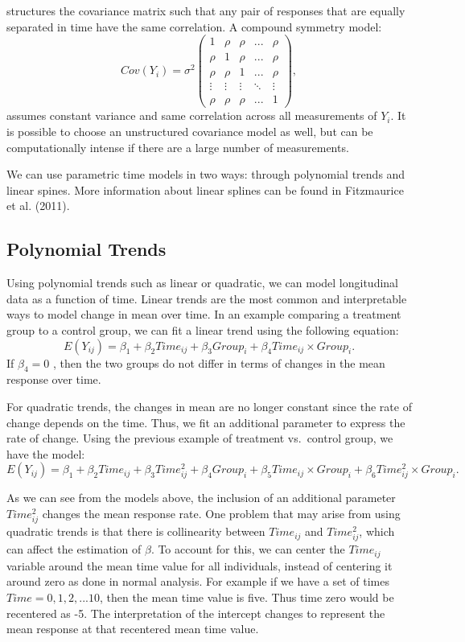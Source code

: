 \documentclass[12pt, twoside]{amherstthesis}
\begin{document}
structures the covariance matrix such that any pair of responses that are equally separated in time have the same correlation. A compound symmetry model: \[Cov (Y_i) = \sigma^2\begin{pmatrix} 1 & \rho & \rho & ... & \rho \\ \rho & 1 & \rho & ... & \rho \\ \rho & \rho & 1 & ...& \rho \\ \vdots & \vdots & \vdots & \ddots& \vdots \\ \rho & \rho & \rho & ... & 1   \end{pmatrix}, \] assumes constant variance and same correlation across all measurements of \(Y_i.\) It is possible to choose an unstructured covariance model as well, but can be computationally intense if there are a large number of measurements.

We can use parametric time models in two ways: through polynomial trends and linear spines. More information about linear splines can be found in Fitzmaurice et al. (2011).

\hypertarget{polynomial-trends}{%
\subsection{Polynomial Trends}\label{polynomial-trends}}

Using polynomial trends such as linear or quadratic, we can model longitudinal data as a function of time. Linear trends are the most common and interpretable ways to model change in mean over time. In an example comparing a treatment group to a control group, we can fit a linear trend using the following equation: \[E(Y_{ij}) = \beta_1 + \beta_2Time_{ij}+\beta_3Group_i+\beta_4Time_{ij} \times Group_i.\] If \(\beta_4 = 0\) , then the two groups do not differ in terms of changes in the mean response over time.

For quadratic trends, the changes in mean are no longer constant since the rate of change depends on the time. Thus, we fit an additional parameter to express the rate of change.
Using the previous example of treatment vs.~control group, we have the model:
\[E(Y_{ij}) = \beta_1 + \beta_2Time_{ij}+\beta_3Time^2_{ij}+\beta_4Group_i + \beta_5Time_{ij} \times Group_i + \beta_6Time^2_{ij} \times Group_i.\]

As we can see from the models above, the inclusion of an additional parameter \(Time^2_{ij}\) changes the mean response rate. One problem that may arise from using quadratic trends is that there is collinearity between \(Time_{ij}\) and \(Time^2_{ij}\), which can affect the estimation of \(\beta\). To account for this, we can center the \(Time_{ij}\) variable around the mean time value for all individuals, instead of centering it around zero as done in normal analysis. For example if we have a set of times \(Time = {0,1,2,...10}\), then the mean time value is five. Thus time zero would be recentered as -5. The interpretation of the intercept changes to represent the mean response at that recentered mean time value.
\end{document}
